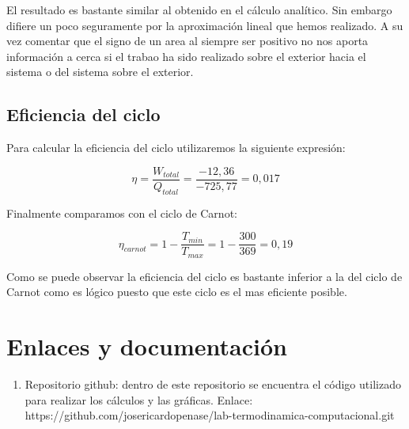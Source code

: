 \documentclass{article}
\begin{document}
El resultado es bastante similar al obtenido en el cálculo analítico. Sin embargo difiere un poco seguramente
por la aproximación lineal que hemos realizado. A su vez comentar que el signo de un area al siempre ser positivo no nos aporta información a cerca 
si el trabao ha sido realizado sobre el exterior hacia el sistema o del sistema sobre el exterior.

\subsection{Eficiencia del ciclo}

Para calcular la eficiencia del ciclo utilizaremos la siguiente expresión:

\begin{equation}
    \eta = \frac{W_{total}}{Q_{total}} = \frac{-12,36}{-725,77} = 0,017
\end{equation}

Finalmente comparamos con el ciclo de Carnot:

\begin{equation}
    \eta_{carnot} = 1 - \frac{T_{min}}{T_{max}} = 1 - \frac{300}{369} = 0,19
\end{equation}


Como se puede observar la eficiencia del ciclo es bastante inferior a la del ciclo de Carnot como es lógico puesto que 
este ciclo es el mas eficiente posible.

\pagebreak

\section{Enlaces y documentación}
\begin{enumerate}
    \item Repositorio github: dentro de este repositorio se encuentra el código utilizado para realizar los cálculos y las gráficas. Enlace: https://github.com/josericardopenase/lab-termodinamica-computacional.git
\end{enumerate}
\end{document}
